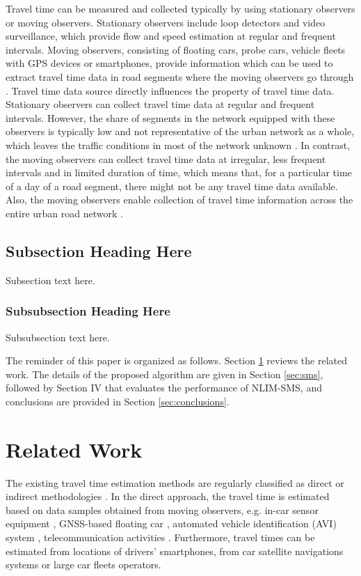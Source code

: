 \documentclass[journal]{IEEEtran}
\begin{document}
Travel time can be measured and collected typically by using stationary observers or moving observers. Stationary observers include loop detectors and video surveillance, which provide flow and speed estimation at regular and frequent intervals. Moving observers, consisting of floating cars, probe cars, vehicle fleets with GPS devices or smartphones, provide information which can be used to extract travel time data in road segments where the moving observers go through \cite{Ma2008}. Travel time data source directly influences the property of travel time data. Stationary observers can collect travel time data at regular and frequent intervals. However, the share of segments in the network equipped with these observers is typically low and not representative of the urban network as a whole, which leaves the traffic conditions in most of the network unknown \cite{Jenelius2013}. In contrast, the moving observers can collect travel time data at irregular, less frequent intervals and in limited duration of time, which means that, for a particular time of a day of a road segment, there might not be any travel time data available. Also, the moving observers enable collection of travel time information across the entire urban road network \cite{Jones2013, Ma2008}. 


\subsection{Subsection Heading Here}
Subsection text here.


\subsubsection{Subsubsection Heading Here}
Subsubsection text here.

The reminder of this paper is organized as follows. Section \ref{sec:related_work} reviews the related work. The details of the proposed algorithm are given in Section \ref{sec:sms}, followed by Section IV that evaluates the performance of NLIM-SMS, and conclusions are provided in Section \ref{sec:conclusions}.

\section{Related Work}
\label{sec:related_work}
The existing travel time estimation methods are regularly classified as direct or indirect methodologies \cite{Lu2018}. In the direct approach, the travel time is estimated based on data samples obtained from moving observers, e.g. in-car sensor equipment \cite{Yeon2007,Ernst2014,Guo2015}, GNSS-based floating car \cite{Fabritiis2008,Hadachi2013,Maiti2014,Rahmani2014,Wang2012,Jones2013,Su2010,Lee2017,DepartmentofTransport2016}, automated vehicle identification (AVI) system \cite{Rahmani2014,Ma2008}, telecommunication activities \cite{Vidovic2017, Derrmann2016, Chitraranjan2016, Chitraranjan2015}. Furthermore, travel times can be estimated from locations of drivers' smartphones, from car satellite navigations systems or large car fleets operators. 
\end{document}
